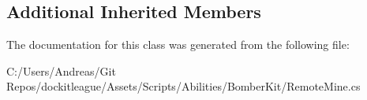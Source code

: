 \subsection*{Additional Inherited Members}


The documentation for this class was generated from the following file\+:\begin{DoxyCompactItemize}
\item 
C\+:/\+Users/\+Andreas/\+Git Repos/dockitleague/\+Assets/\+Scripts/\+Abilities/\+Bomber\+Kit/Remote\+Mine.\+cs\end{DoxyCompactItemize}
